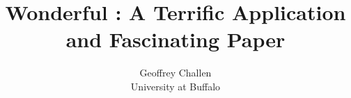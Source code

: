 


\date{}

\title{\Large \bf Wonderful : A Terrific Application and Fascinating Paper}

\author{
{\rm Geoffrey Challen}\\
University at Buffalo
} %

\maketitle




{\footnotesize

}



